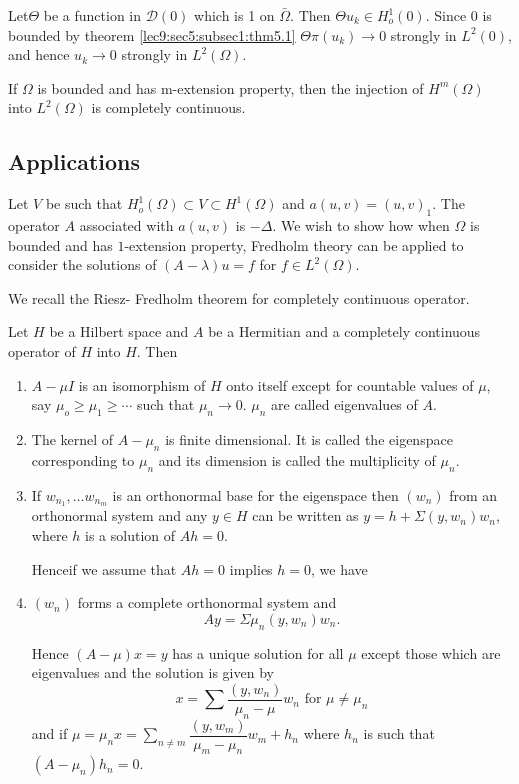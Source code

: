 Let\pageoriginale $\Theta$ be a function in $\mathscr{D}(0)$ which is 1 on
$\bar{\Omega}$. Then $\Theta u_k \in H^1_o (0)$. Since 0 is
bounded by theorem \ref{lec9:sec5:subsec1:thm5.1} $\Theta \pi (u_k) \to 0$ strongly in $L^2
(0)$, and hence $u_k \to 0$ strongly in $L^2 (\Omega)$. 

\begin{coro*}
If $\Omega$ is bounded and has m-extension property, then the
injection of $H^m (\Omega)$ into $L^2 (\Omega)$ is completely
continuous. 
\end{coro*}

\subsection{Applications}\label{lec9:sec5:subsec3} %

Let $V$ be such that $H^1_o (\Omega) \subset V \subset H^1 (\Omega)$
and $a(u,v) = (u, v)_1$. The operator $A$ associated with $a (u,v)$ is
$-\Delta$. We wish to show how when $\Omega$ is bounded and has
$1$-extension property, Fredholm theory can be applied to consider the
solutions of $(A-\lambda) u =f$ for $f \in L^2 (\Omega)$. 

We recall the Riesz- Fredholm theorem for completely continuous operator.

Let $H$ be a Hilbert space and $A$ be a Hermitian and a completely
continuous operator of $H$ into $H$. Then  
\begin{enumerate}[1)]
\item $A- \mu I$ is an isomorphism of $H$ onto itself except for
  countable values of $\mu$, say $\mu_o \geq \mu _1 \geq \cdots$ such
  that $\mu_n \to 0$. $\mu_n$ are called eigenvalues of $A$. 
\item The kernel of $A- \mu_n$ is finite dimensional. It is called the
  eigenspace corresponding to $\mu _n$ and its dimension is called the
  multiplicity of $\mu_n$. 
\item If $w_{n_1}, \ldots w_{n_m}$ is an orthonormal base for the
  eigenspace then $(w_n)$ from an orthonormal system and any $y
  \in H$ can be written as $y = h + \Sigma (y , w_n)w_n$,
  where $h$ is a solution of $Ah =0$. 

 Hence\pageoriginale if we assume that $Ah = 0$ implies $h=0$, we have
\item $(w_n)$ forms a complete orthonormal system and 
  $$
  Ay = \Sigma \mu_n (y , w_n)w_n.
  $$

  Hence $(A- \mu) x= y$ has a unique solution for all $\mu $ except
  those which are eigenvalues and the solution is given by 
  $$
  x = \sum \frac{(y, w_n)}{\mu_n - \mu} w_n \text{ for } \mu \neq \mu_n
  $$
  and if $\mu = \mu_n x= \sum\limits_{n \neq m} \dfrac{(y ,
    w_m)}{\mu_m - \mu_n} w_m + h_n$ where $h_n$ is such that $(A -
  \mu_n)h_n =0$.  
\end{enumerate}

